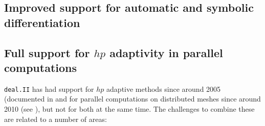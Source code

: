 \documentclass{ansarticle-preprint}
\newcommand{\specialword}[1]{\texttt{#1}}
\newcommand{\dealii}{{\specialword{deal.II}}\xspace}
\begin{document}
\subsection{Improved support for automatic and symbolic differentiation}

\subsection{Full support for $hp$ adaptivity in parallel computations}

\dealii{} has had support for $hp$ adaptive methods since around 2005
(documented in \cite{BangerthKayserHerold2007} and for parallel
computations on distributed meshes since around 2010 (see
\cite{BangerthBursteddeHeisterKronbichler11}), but not for both at the
same time. The challenges to combine these are related to a number of
areas:
\end{document}

